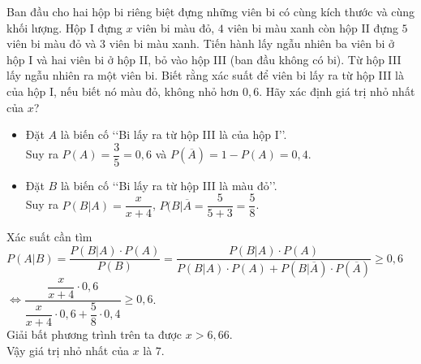 \begin{bt}%
  
	Ban đầu cho hai hộp bi riêng biệt đựng những viên bi có cùng kích thước và cùng khối lượng. Hộp I đựng $x$ viên bi màu đỏ, $4$ viên bi màu xanh còn hộp II đựng $5$ viên bi màu đỏ và $3$ viên bi màu xanh. Tiến hành lấy ngẫu nhiên ba viên bi ở hộp I và hai viên bi ở hộp II, bỏ vào hộp III (ban đầu không có bi). Từ hộp III lấy ngẫu nhiên ra một viên bi. Biết rằng xác suất để viên bi lấy ra từ hộp III là của hộp I, nếu biết nó màu đỏ, không nhỏ hơn $0{,}6$. Hãy xác định giá trị nhỏ nhất của $x$?
	\begin{center}
	\end{center}
	
	\loigiai
	{
	\begin{itemize}
		\item Đặt $A$ là biến cố \lq\lq Bi lấy ra từ hộp III là của hộp I\rq\rq. \\Suy ra $P(A) = \dfrac{3}{5} = 0{,}6$ và $P(\overline{A})=1-P(A)=0{,}4$.
		\item Đặt $B$ là biến cố  \lq\lq Bi lấy ra từ hộp III là màu đỏ\rq\rq.\\
		Suy ra $P(B|A)=\dfrac{x}{x+4}$, $P(B|\overline{A}=\dfrac{5}{5+3}=\dfrac{5}{8}$.
	\end{itemize}
	
	Xác suất cần tìm $ P(A|B) = \dfrac{P(B|A) \cdot P(A)}{P(B)}=\dfrac{P(B|A) \cdot P(A)}{P(B|A) \cdot P(A) + P(B|\overline{A}) \cdot P(\overline{A})}\geq 0{,}6$ \\ $\Leftrightarrow \dfrac{\dfrac{x}{x+4} \cdot 0{,}6}{\dfrac{x}{x+4} \cdot 0{,}6 + \dfrac{5}{8} \cdot 0{,}4} \geq 0{,}6$.\\
	Giải bất phương trình trên ta được $ x > 6{,}66$.\\
	Vậy giá trị nhỏ nhất của $x$ là $7$.
}
\end{bt}

